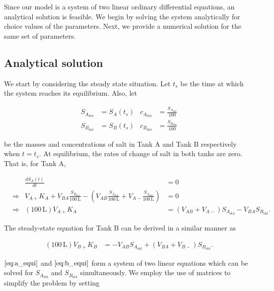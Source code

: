 Since our model is a system of two linear ordinary differential
equations, an analytical solution is feasible. We begin by solving the
system analytically for choice values of the parameters. Next, we
provide a numerical solution for the same set of parameters.

\subsection{Analytical solution}\label{analytical-solution}

We start by considering the steady state situation. Let \(t_s\) be the
time at which the system reaches its equilibrium. Also, let

\begin{align*}
  S_{A_{\text{std}}} &= S_A(t_s) & c_{A_{\text{std}}} &= \frac{S_{A_{\text{std}}}}{100} \\
  S_{B_{\text{std}}} &= S_B(t_s) & c_{B_{\text{std}}} &= \frac{S_{B_{\text{std}}}}{100}
\end{align*}

be the masses and concentrations of salt in Tank A and Tank B
respectively when \(t=t_s\). At equilibrium, the rates of change of salt
in both tanks are zero. That is, for Tank A,

\begin{align}
  && \frac{dS_A(t)}{dt} &= 0 \\
  &\Rightarrow& V_{A+} K_A + V_{BA}\frac{S_{B_{\text{std}}}}{100\,\text{L}} - \left(V_{AB}\frac{S_{A_{\text{std}}}}{100\,\text{L}} + V_{A-}\frac{S_{A_{\text{std}}}}{100\,\text{L}}\right) &= 0 \\
  &\Rightarrow& (100\,\text{L})V_{A+} K_A &= (V_{AB} + V_{A-})S_{A_{\text{std}}} - V_{BA}S_{B_{\text{std}}}. \label{eq:a_equi}
\end{align}

The steady-state equation for Tank B can be derived in a similar manner
as

\begin{align}
  (100\,\text{L})V_{B+} K_B &= - V_{AB}S_{A_{\text{std}}} + (V_{BA} + V_{B-})S_{B_{\text{std}}}. \label{eq:b_equi}
\end{align}

\(\autoref{eq:a_equi}\) and \(\autoref{eq:b_equi}\) form a system of two
linear equations which can be solved for \(S_{A_{\text{std}}}\) and
\(S_{B_{\text{std}}}\) simultaneously. We employ the use of matrices to
simplify the problem by setting

